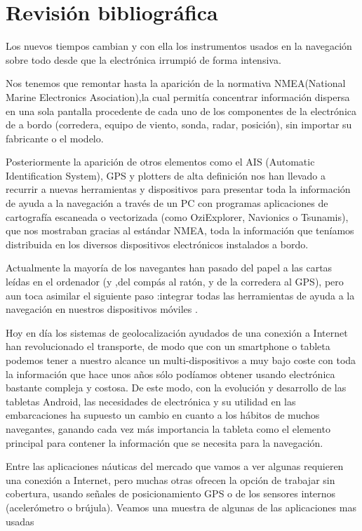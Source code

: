 \chapter{Revisión bibliográfica}
\label{revision}

Los nuevos tiempos cambian y con ella los instrumentos usados en la
navegación sobre todo desde que la electrónica irrumpió de forma
intensiva.

Nos tenemos que remontar hasta la aparición de la normativa 
NMEA(National Marine Electronics Asociation),la cual permitía
concentrar información dispersa en una sola pantalla procedente de
cada uno de los componentes de la electrónica de a bordo (corredera,
equipo de viento, sonda, radar, posición), sin importar su fabricante
o el modelo.

Posteriormente la aparición de otros elementos como el AIS (Automatic
Identification System), GPS y plotters de alta definición nos han
llevado a recurrir a nuevas herramientas y dispositivos para presentar
toda la información de ayuda a la navegación a través de un PC con
programas aplicaciones de cartografía escaneada o vectorizada (como
OziExplorer, Navionics o Tsunamis), que nos mostraban gracias al
estándar NMEA, toda la información que teníamos distribuida en los
diversos dispositivos electrónicos instalados a bordo.

Actualmente la mayoría de los navegantes han pasado del papel a las
cartas leídas en el ordenador (y ,del compás al ratón, y de la
corredera al GPS), pero aun toca asimilar el siguiente paso :integrar
todas las herramientas de ayuda a la navegación en nuestros
dispositivos móviles .

Hoy en día los sistemas de geolocalización ayudados de una conexión a
Internet han revolucionado el transporte, de modo que con un
smartphone o tableta podemos tener a nuestro alcance un
multi-dispositivos a muy bajo coste con toda la información que hace
unos años sólo podíamos obtener usando electrónica bastante compleja y
costosa. De este modo, con la evolución y desarrollo de las tabletas
Android, las necesidades de electrónica y su utilidad en las
embarcaciones ha supuesto un cambio en cuanto a los hábitos de muchos
navegantes, ganando cada vez más importancia la tableta como el
elemento principal para contener la información que se necesita para
la navegación.

Entre las aplicaciones náuticas del mercado que vamos a ver algunas
requieren una conexión a Internet, pero muchas otras ofrecen la opción
de trabajar sin cobertura, usando señales de posicionamiento GPS o de
los sensores internos (acelerómetro o brújula). Veamos una muestra de
algunas de las aplicaciones mas usadas
  
